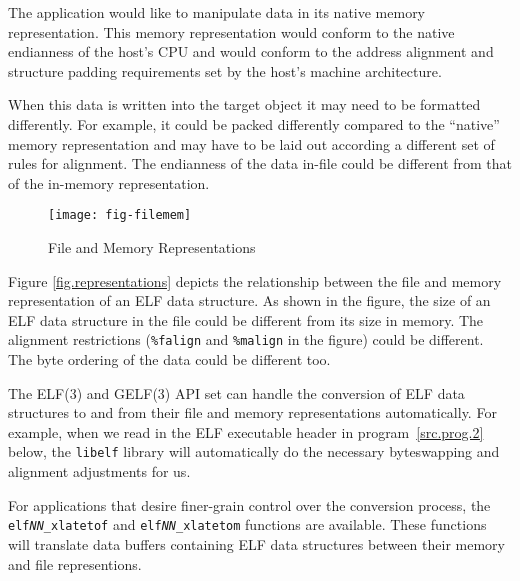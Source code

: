 \documentclass[a4paper,pdftex]{book}
\newcommand{\function}[1]{\texttt{#1}}
\newcommand{\library}[1]{\texttt{#1}}
\newcommand{\parameter}[1]{\texttt{#1}}
\begin{document}
The application would like to manipulate data in its native memory
representation.  This memory
representation would conform to the native endianness of the host's
CPU and would conform to the address alignment and structure padding
requirements set by the host's machine architecture.

 When this data is written into
the target object it may need to be formatted differently.  For
example, it could be packed differently compared to the ``native''
memory representation and may have to be laid out according a
different set of rules for alignment.  The endianness of the data
in-file could be different from that of the in-memory representation.

\begin{figure}
  \caption{File and Memory Representations}\label{fig.representations}
  \begin{center}
    \texttt{[image: fig-filemem]}
  \end{center}
\end{figure}

Figure \vref{fig.representations} depicts the relationship between the
file and memory representation of an ELF data structure.  As shown in
the figure, the size of an ELF data structure in the file could be
different from its size in memory.  The alignment restrictions
(\parameter{\%falign} and \parameter{\%malign} in the figure) could be
different.  The byte ordering of the data could be different too.%

The ELF(3) and GELF(3) API set can handle the conversion of ELF data
structures to and from their file and memory representations
automatically.  For example, when we read in the ELF executable header
in program~\vref{src.prog.2} below, the \library{libelf} library will
automatically do the necessary byteswapping and alignment adjustments
for us.%
%
%
\index{libelf@\library{libelf}!automatic data conversion}

For applications that desire finer-grain control over the conversion
process, the \function{elf\textit{NN}\_xlatetof} and
\function{elf\textit{NN}\_xlatetom} functions are available.  These
functions will translate data buffers containing ELF data structures
between their memory and file representions.%
\end{document}
